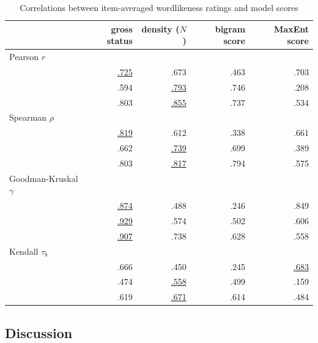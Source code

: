 \begin{table}
\centering
\begin{tabular}{l rrrr}
\toprule
                           & gross status & density ($N$) & bigram score & MaxEnt score \\
\midrule
Pearson $r$               \\
\midrule
\citeauthor{Albright2007}  & \uline{.725} & {.673}        & {.463}       & {.703} \\
\citeauthor{Albright2003b} & {.594}       & \uline{.793}  & {.746}       & {.208} \\
\citeauthor{Scholes1966}   & {.803}       & \uline{.855}  & {.737}       & {.534} \\
\midrule
Spearman $\rho$           \\
\midrule

\citeauthor{Albright2007}  & \uline{.819} & {.612}        & {.338}       & {.661} \\
\citeauthor{Albright2003b} & {.662}       & \uline{.739}  & {.699}       & {.389} \\
\citeauthor{Scholes1966}   & {.803}       & \uline{.817}  & {.794}       & {.575} \\
\midrule
Goodman-Kruskal $\gamma$  \\
\midrule
\citeauthor{Albright2007}  & \uline{.874} & {.488}        & {.246}       & {.849} \\
\citeauthor{Albright2003b} & \uline{.929} & {.574}        & {.502}       & {.606} \\
\citeauthor{Scholes1966}   & \uline{.907} & {.738}        & {.628}       & {.558} \\
\midrule
Kendall $\tau_{b}$        \\
\midrule
\citeauthor{Albright2007}  & {.666}       & {.450}        & {.245}       & \uline{.683} \\
\citeauthor{Albright2003b} & {.474}       & \uline{.558}  & {.499}       & {.159} \\
\citeauthor{Scholes1966}   & {.619}       & \uline{.671}  & {.614}       & {.484} \\
\bottomrule
\end{tabular}
\caption{Correlations between item-averaged wordlikeness ratings and model scores}
\label{scores}
\end{table}

\subsection{Discussion}

